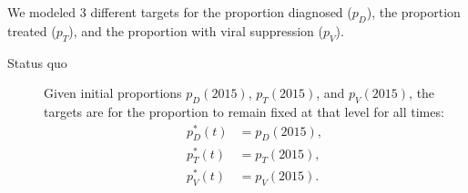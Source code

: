 \documentclass{article}
\begin{document}
We modeled 3 different targets for the proportion diagnosed ($p_D$), the
proportion treated ($p_T$), and the proportion with viral suppression ($p_V$).
\begin{description}
\item[Status quo] Given initial proportions $p_D(2015)$, $p_T(2015)$,
  and $p_V(2015)$, the targets are for the proportion to remain fixed
  at that level for all times:
  \begin{equation}
    \label{status_quo_target}
    \begin{split}
      p_D^*(t) &= p_D(2015), \\
      p_T^*(t) &= p_T(2015), \\
      p_V^*(t) &= p_V(2015).
    \end{split}
  \end{equation}


\end{description}
\end{document}
